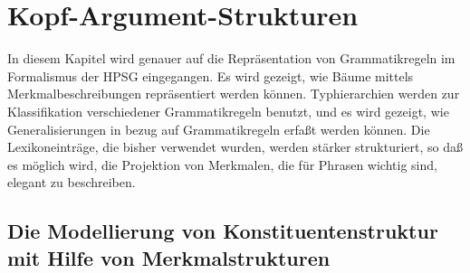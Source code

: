 

\chapter{Kopf-Argument-Strukturen}
\label{chap-komplementation}

In diesem Kapitel wird genauer auf die Repräsentation von Grammatikregeln
im Formalismus der HPSG eingegangen. Es wird gezeigt, wie Bäume mittels Merkmalbeschreibungen
repräsentiert werden können. Typhierarchien werden zur Klassifikation verschiedener
Grammatikregeln benutzt, und es wird gezeigt, wie Generalisierungen in bezug
auf Grammatikregeln erfaßt werden können. Die Lexikoneinträge, die bisher verwendet wurden,
werden stärker strukturiert, so daß es möglich wird, die Projektion
von Merkmalen, die für Phrasen wichtig sind, elegant zu beschreiben. 

\section{Die Modellierung von Konstituentenstruktur mit Hilfe von Merkmalstrukturen}

